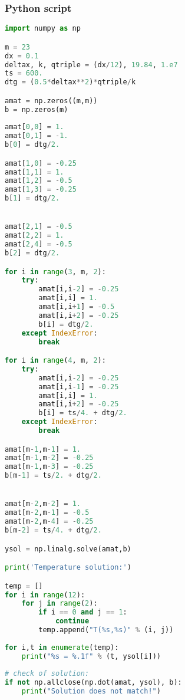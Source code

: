 \subsubsection{Python script}
\label{py1}
\begin{lstlisting}[language=python]
import numpy as np

m = 23
dx = 0.1
deltax, k, qtriple = (dx/12), 19.84, 1.e7
ts = 600.
dtg = (0.5*deltax**2)*qtriple/k

amat = np.zeros((m,m))
b = np.zeros(m)
    
amat[0,0] = 1.
amat[0,1] = -1.
b[0] = dtg/2.

amat[1,0] = -0.25
amat[1,1] = 1.
amat[1,2] = -0.5
amat[1,3] = -0.25
b[1] = dtg/2.


amat[2,1] = -0.5
amat[2,2] = 1.
amat[2,4] = -0.5
b[2] = dtg/2.

for i in range(3, m, 2):
    try:
        amat[i,i-2] = -0.25
        amat[i,i] = 1.
        amat[i,i+1] = -0.5
        amat[i,i+2] = -0.25
        b[i] = dtg/2.
    except IndexError:
        break

for i in range(4, m, 2):
    try:
        amat[i,i-2] = -0.25
        amat[i,i-1] = -0.25
        amat[i,i] = 1.
        amat[i,i+2] = -0.25
        b[i] = ts/4. + dtg/2.
    except IndexError:
        break

amat[m-1,m-1] = 1.
amat[m-1,m-2] = -0.25
amat[m-1,m-3] = -0.25
b[m-1] = ts/2. + dtg/2.


amat[m-2,m-2] = 1.
amat[m-2,m-1] = -0.5
amat[m-2,m-4] = -0.25
b[m-2] = ts/4. + dtg/2.

ysol = np.linalg.solve(amat,b)

print('Temperature solution:')

temp = []
for i in range(12):
    for j in range(2):
        if i == 0 and j == 1:
            continue
        temp.append("T(%s,%s)" % (i, j))
        
for i,t in enumerate(temp):
    print("%s = %.1f" % (t, ysol[i]))
    
# check of solution: 
if not np.allclose(np.dot(amat, ysol), b):
    print("Solution does not match!")
\end{lstlisting}
\newpage
